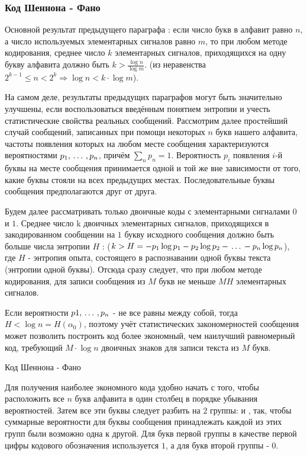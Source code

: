 ﻿\documentclass[a4paper,12pt]{report}
\begin{document}
	\subsubsection{Код Шеннона - Фано}
		
	
	
	Основной результат предыдущего параграфа : если число букв в алфавит равно $n$, а число используемых элементарных сигналов равно $m$, то при любом методе кодирования, среднее число $k$ элементарных сигналов, приходящихся на одну букву алфавита должно быть $k > \frac{\log n}{\log m}$. (из неравенства $2^{k-1} \le n < 2^k \Rightarrow \log n < k \cdot \log m$).
	
	На самом деле, результаты предыдущих параграфов могут быть значительно улучшены, если воспользоваться введённым понятием энтропии и учесть статистические свойства реальных сообщений. Рассмотрим далее простейший случай сообщений, записанных при помощи некоторых $n$ букв нашего алфавита, частоты появления которых на любом месте сообщения характеризуются вероятностями $p_1, \,\ldots\, ,p_n$, причём $\sum\limits_n p_n = 1$. Вероятность $p_i$ появления $i$-й буквы на  месте сообщения принимается одной и той же вне зависимости от того, какие буквы стояли на всех предыдущих местах. Последовательные буквы сообщения предполагаются  друг от друга.
	
	Будем далее рассматривать только двоичные коды с элементарными сигналами $0$ и $1$. Среднее число k двоичных элементарных сигналов, приходящихся в закодированном сообщении на $1$ букву исходного сообщения должно быть больше числа энтропии $H$ : ($k > H = -p_1 \log p_1 - p_2 \log p_2 - \,\ldots\, - p_n \log p_n$), где $H$ - энтропия опыта, состоящего в распознавании одной буквы текста (энтропии одной буквы). Отсюда сразу следует, что при любом методе кодирования, для записи сообщения из $M$ букв не меньше $MH$ элементарных сигналов.
	
	Если вероятности $p1, \,\ldots\, ,p_n$ - не все равны между собой, тогда $H < \log n = H(\alpha_0)$, поэтому учёт статистических закономерностей сообщения может позволить построить код более экономный, чем наилучший равномерный код, требующий $M \cdot \log n$ двоичных знаков для записи текста из $M$ букв.
	
	Код Шеннона - Фано
	
	Для получения наиболее экономного кода удобно начать с того, чтобы расположить все $n$ букв алфавита в один столбец в порядке убывания вероятностей. Затем все эти буквы следует разбить на $2$ группы:  и , так, чтобы суммарные вероятности для буквы сообщения принадлежать каждой из этих групп были возможно  одна к другой. Для букв первой группы в качестве первой цифры кодового обозначения используется $1$, $а$ для букв второй группы - $0$.
	
\end{document}
